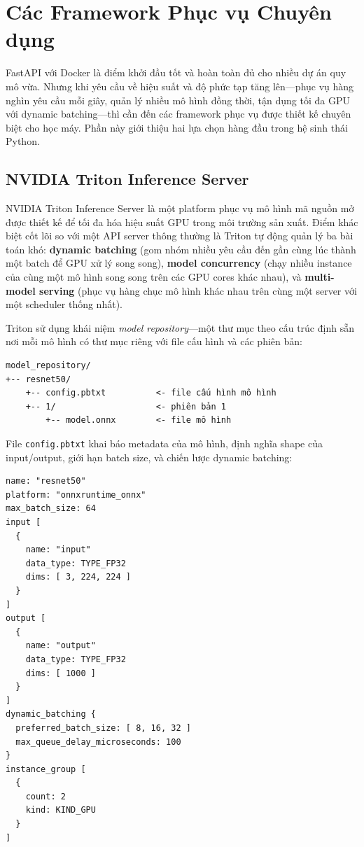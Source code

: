 \section{Các Framework Phục vụ Chuyên dụng}
\label{sec:serving_frameworks}

FastAPI với Docker là điểm khởi đầu tốt và hoàn toàn đủ cho nhiều dự án quy mô vừa. Nhưng khi yêu cầu về hiệu suất và độ phức tạp tăng lên---phục vụ hàng nghìn yêu cầu mỗi giây, quản lý nhiều mô hình đồng thời, tận dụng tối đa GPU với dynamic batching---thì cần đến các framework phục vụ được thiết kế chuyên biệt cho học máy. Phần này giới thiệu hai lựa chọn hàng đầu trong hệ sinh thái Python.

\subsection{NVIDIA Triton Inference Server}
\label{subsec:triton}

NVIDIA Triton Inference Server là một platform phục vụ mô hình mã nguồn mở được thiết kế để tối đa hóa hiệu suất GPU trong môi trường sản xuất. Điểm khác biệt cốt lõi so với một API server thông thường là Triton tự động quản lý ba bài toán khó: \textbf{dynamic batching} (gom nhóm nhiều yêu cầu đến gần cùng lúc thành một batch để GPU xử lý song song), \textbf{model concurrency} (chạy nhiều instance của cùng một mô hình song song trên các GPU cores khác nhau), và \textbf{multi-model serving} (phục vụ hàng chục mô hình khác nhau trên cùng một server với một scheduler thống nhất).

Triton sử dụng khái niệm \textit{model repository}---một thư mục theo cấu trúc định sẵn nơi mỗi mô hình có thư mục riêng với file cấu hình và các phiên bản:

\begin{verbatim}
model_repository/
+-- resnet50/
    +-- config.pbtxt          <- file cấu hình mô hình
    +-- 1/                    <- phiên bản 1
        +-- model.onnx        <- file mô hình
\end{verbatim}

File \texttt{config.pbtxt} khai báo metadata của mô hình, định nghĩa shape của input/output, giới hạn batch size, và chiến lược dynamic batching:

\begin{verbatim}
name: "resnet50"
platform: "onnxruntime_onnx"
max_batch_size: 64
input [
  {
    name: "input"
    data_type: TYPE_FP32
    dims: [ 3, 224, 224 ]
  }
]
output [
  {
    name: "output"
    data_type: TYPE_FP32
    dims: [ 1000 ]
  }
]
dynamic_batching {
  preferred_batch_size: [ 8, 16, 32 ]
  max_queue_delay_microseconds: 100
}
instance_group [
  {
    count: 2
    kind: KIND_GPU
  }
]
\end{verbatim}

